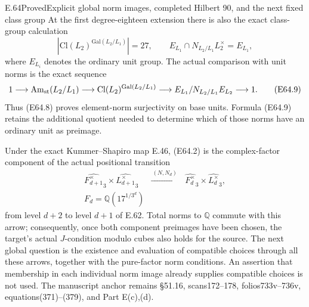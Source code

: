 \begin{statement}{E.64}{Proved}{Explicit global norm images, completed Hilbert 90, and the next fixed class group}
At the first degree-eighteen extension there is also the exact
class-group calculation
\[
 \left|\mathrm {Cl}(L_2)^{\mathrm {Gal}(L_2/L_1)}\right|=27,
 \qquad
 E_{L_1}\cap N_{L_2/L_1}L_2^\times=E_{L_1},
 \tag{E64.8}
\]
where $E_{L_i}$ denotes the ordinary unit group.
The actual comparison with unit norms is the exact sequence
\[
 1\longrightarrow \mathrm {Am}_{\rm st}(L_2/L_1)
 \longrightarrow \mathrm {Cl}(L_2)^{\mathrm {Gal}(L_2/L_1)}
 \longrightarrow E_{L_1}/N_{L_2/L_1}E_{L_2}
 \longrightarrow1 .
 \tag{E64.9}
\]
Thus (E64.8) proves element-norm surjectivity on base units.
Formula (E64.9) retains the additional quotient needed to determine
which of those norms have an ordinary unit as preimage.

Under the exact Kummer--Shapiro map E.46, (E64.2) is the complex-factor
component of the actual positional transition
\[
 \begin{array}{ccc}
 \widehat{F_{d+1}^\times}_3\times
       \widehat{L_{d+1}^\times}_3
 &\xrightarrow{\ (N,N_d)\ }&
 \widehat{F_d^\times}_3\times\widehat{L_d^\times}_3,\\[-1mm]
 F_d=\mathbb Q(17^{1/3^d})&&
 \end{array}
 \tag{E64.10}
\]
from level $d+2$ to level $d+1$ of E.62.
Total norms to $\mathbb Q$ commute with this arrow; consequently,
once both component preimages have been chosen, the target's actual
$J$-condition modulo cubes also holds for the source.
The next global question is the existence and evaluation of compatible
choices through all these arrows, together with the pure-factor norm
conditions. An assertion that membership in each individual norm image
already supplies compatible choices is not used.
The manuscript anchor remains \S51.16, scans172--178, folios733v--736v,
equations(371)--(379), and Part E(c),(d).
\end{statement}

